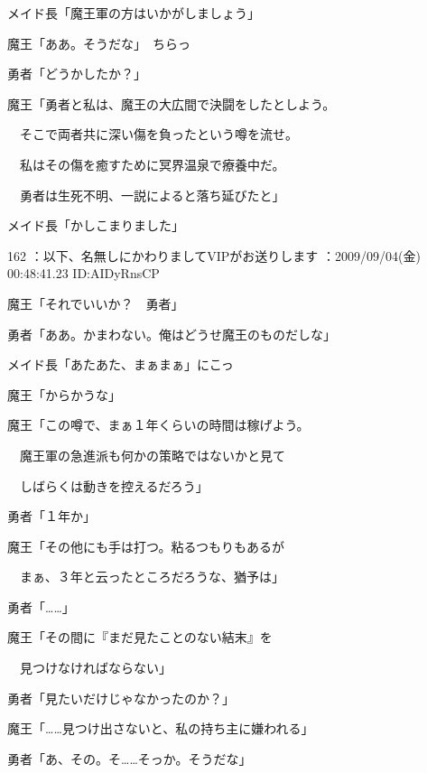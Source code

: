 \documentclass[a4j,twocolumn]{tarticle}
\begin{document}
メイド長「魔王軍の方はいかがしましょう」 



魔王「ああ。そうだな」　ちらっ 



勇者「どうかしたか？」 



魔王「勇者と私は、魔王の大広間で決闘をしたとしよう。\par{} 
　そこで両者共に深い傷を負ったという噂を流せ。\par{} 
　私はその傷を癒すために冥界温泉で療養中だ。\par{} 
　勇者は生死不明、一説によると落ち延びたと」 



メイド長「かしこまりました」 

	
    
    

162 ：以下、名無しにかわりましてVIPがお送りします ：2009/09/04(金) 00:48:41.23 ID:AIDyRnsCP 


魔王「それでいいか？　勇者」 \par{}
勇者「ああ。かまわない。俺はどうせ魔王のものだしな」 



メイド長「あたあた、まぁまぁ」にこっ\par{} 
魔王「からかうな」 



魔王「この噂で、まぁ１年くらいの時間は稼げよう。\par{} 
　魔王軍の急進派も何かの策略ではないかと見て\par{} 
　しばらくは動きを控えるだろう」 



勇者「１年か」 



魔王「その他にも手は打つ。粘るつもりもあるが\par{} 
　まぁ、３年と云ったところだろうな、猶予は」\par{} 
勇者「……」 



魔王「その間に『まだ見たことのない結末』を\par{} 
　見つけなければならない」\par{} 
勇者「見たいだけじゃなかったのか？」 



魔王「……見つけ出さないと、私の持ち主に嫌われる」\par{} 
勇者「あ、その。そ……そっか。そうだな」 
\end{document}
